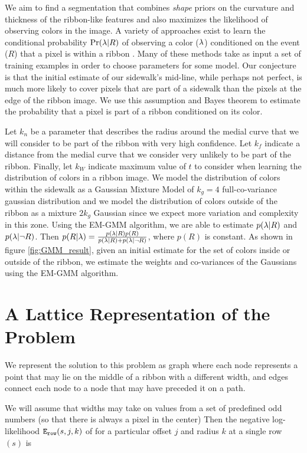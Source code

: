 We aim to find a segmentation that combines \textit{shape} priors on the curvature and thickness of the ribbon-like features and also maximizes the likelihood of observing colors in the image. 
A variety of approaches exist to learn the conditional probability $\Pr(\lambda{}|R)$ of observing a color ($\lambda{}$)
 conditioned on the event ($R$) that a pixel is within a ribbon \cite{hartigan1979algorithm, jordan1999introduction}.
Many of these methods take as input a set of training examples in order to choose parameters for some model.
Our conjecture is that the initial estimate of our sidewalk's mid-line, while perhaps not perfect, is much more likely to cover pixels that are part of a sidewalk than the pixels at the edge of the ribbon image. 
We use this assumption and Bayes theorem to estimate the probability that a pixel is part of a ribbon conditioned on its color.

Let $k_n$ be a parameter that describes the radius around the medial curve that we will consider to be part of the ribbon with very high confidence. 
Let $k_f$ indicate a distance from the medial curve that we consider very unlikely to be part of the ribbon. 
Finally, let $k_W$ indicate maximum value of $t$ to consider when learning the distribution of colors in a ribbon image. 
We model the distribution of colors within the sidewalk as a Gaussian Mixture Model of $k_g=4$ full-co-variance gaussian distribution and we model the distribution of colors outside of the ribbon as a mixture $2k_g$ Gaussian since we expect more variation and complexity in this zone. 
Using the \ac{EM-GMM} algorithm, we are able to estimate $p(\lambda{}|R)$ and $p(\lambda{}|\neg R)$. 
Then $p(R|\lambda{})=\frac{p(\lambda{}|R)p(R)}{p(\lambda{}|R)+p(\lambda{}|\neg R)}$, where $p(R)$ is constant. 
As shown in figure \ref{fig:GMM_result}, given an initial estimate for the set of colors inside or outside of the ribbon, we estimate the weights and co-variances of the Gaussians using the \ac{EM-GMM} \cite{sridharan2014gaussian} algorithm. 


\section{A Lattice Representation of the Problem} 
We represent the solution to this problem as graph where each node represents a point that may lie on the middle of a ribbon with a different width, and edges connect each node to a node that may have preceded it on a path. 

We will assume that widths may take on values from a set 
of predefined odd numbers (so that there is always a pixel in the center) 
Then the negative log-likelihood $\mathtt{E_{row}}(s, j, k)$ of for a 
particular offset $j$ and radius $k$ at a single row $(s)$ is 

